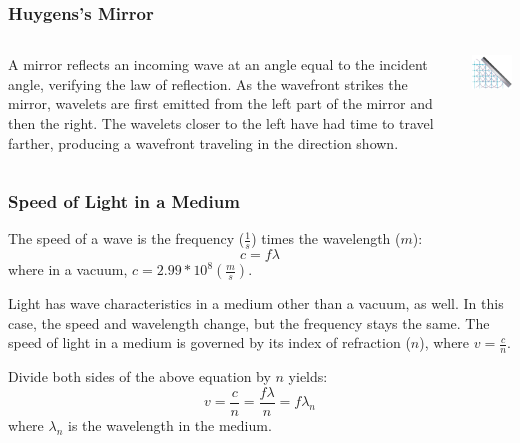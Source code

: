 \documentclass{beamer}
\begin{document}
\begin{frame}\frametitle{Huygens's Mirror}
\begin{columns}
\begin{column}{6cm}
A mirror reflects an incoming wave at an angle equal to the incident angle, verifying the law of reflection. As the wavefront strikes the mirror, wavelets are first emitted from the left part of the mirror and then the right. The wavelets closer to the left have had time to travel farther, producing a wavefront traveling in the direction shown.
\end{column}
\begin{column}{5cm}
\begin{center}
\includegraphics[width=5cm]{fig/huyMirror.jpg}
\end{center}
\end{column}
\end{columns}
\end{frame}

\begin{frame}\frametitle{Speed of Light in a Medium}
The speed of a wave is the frequency ($\frac{1}{s}$) times the wavelength ($m$):
\begin{equation}
c = f \lambda
\end{equation}
where in a vacuum, $c = 2.99 * 10^8 (\frac{m}{s})$. \newline

Light has wave characteristics in a medium other than a vacuum, as well. In this case, the speed and wavelength change, but the frequency stays the same. The speed of light in a medium is governed by its index of refraction ($n$), where $v = \frac{c}{n}$. \newline

Divide both sides of the above equation by $n$ yields:
\begin{equation}
v = \frac{c}{n} = \frac{f \lambda}{n} = f \lambda_n
\end{equation}
where $\lambda_n$ is the wavelength in the medium.
\end{frame}
\end{document}
